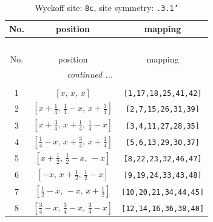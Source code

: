 \documentclass[fleqn,8pt]{jsarticle}
\begin{document}
\renewcommand{\arraystretch}{1.2}
\begin{longtable}{ccc}
\caption{Wyckoff site: {\tt 8c}, site symmetry: {\tt .3.1'}}
 \\
 \hline \hline
No. & position & mapping \\ \hline \endfirsthead

\multicolumn{2}{l}{\tablename\ \thetable{}} \\
 \hline \hline
No. & position & mapping \\ \hline \endhead

 \hline \hline
\multicolumn{2}{r}{\footnotesize\it continued ...} \\ \endfoot

 \hline \hline
\multicolumn{2}{r}{} \\ \endlastfoot

1 & $\left[ x,\, x,\, x \right]$ & {\tt [1,17,18,25,41,42]} \\ \hline
2 & $\left[ x + \frac{1}{4},\, \frac{1}{4} - x,\, x + \frac{3}{4} \right]$ & {\tt [2,7,15,26,31,39]} \\ \hline
3 & $\left[ x + \frac{3}{4},\, x + \frac{1}{4},\, \frac{1}{4} - x \right]$ & {\tt [3,4,11,27,28,35]} \\ \hline
4 & $\left[ \frac{1}{4} - x,\, x + \frac{3}{4},\, x + \frac{1}{4} \right]$ & {\tt [5,6,13,29,30,37]} \\ \hline
5 & $\left[ x + \frac{1}{2},\, \frac{1}{2} - x,\, - x \right]$ & {\tt [8,22,23,32,46,47]} \\ \hline
6 & $\left[ - x,\, x + \frac{1}{2},\, \frac{1}{2} - x \right]$ & {\tt [9,19,24,33,43,48]} \\ \hline
7 & $\left[ \frac{1}{2} - x,\, - x,\, x + \frac{1}{2} \right]$ & {\tt [10,20,21,34,44,45]} \\ \hline
8 & $\left[ \frac{3}{4} - x,\, \frac{3}{4} - x,\, \frac{3}{4} - x \right]$ & {\tt [12,14,16,36,38,40]} \\
\end{longtable}
\renewcommand{\arraystretch}{1.2}
\end{document}
